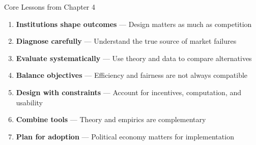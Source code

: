 \documentclass{beamer}
\begin{document}
\begin{frame}{Core Lessons from Chapter 4}
\begin{enumerate}
  \item \textbf{Institutions shape outcomes} --- Design matters as much as competition
  \item \textbf{Diagnose carefully} --- Understand the true source of market failures
  \item \textbf{Evaluate systematically} --- Use theory and data to compare alternatives
  \item \textbf{Balance objectives} --- Efficiency and fairness are not always compatible
  \item \textbf{Design with constraints} --- Account for incentives, computation, and usability
  \item \textbf{Combine tools} --- Theory and empirics are complementary
  \item \textbf{Plan for adoption} --- Political economy matters for implementation
\end{enumerate}
\end{frame}
\end{document}
